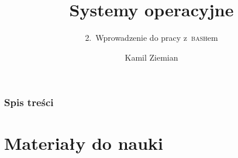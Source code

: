 \documentclass[10pt,t]{beamer}
\title{Systemy operacyjne}
\subtitle{2.~Wprowadzenie do pracy z~\textsc{bash}em}
\author{Kamil Ziemian \\
  \email}
\begin{document}





\RaggedRight





\maketitle





\begin{frame}
  \frametitle{Spis treści}


  \tableofcontents

\end{frame}










\section{Materiały do nauki}
\end{document}
